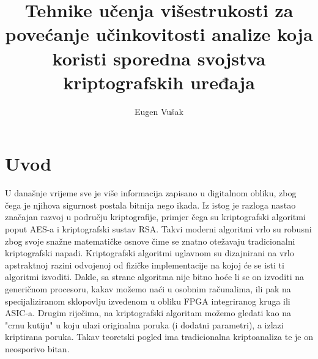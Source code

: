 \documentclass[times, utf8, diplomski]{fer}
\begin{document}

\title{
    Tehnike učenja višestrukosti za povećanje učinkovitosti
    analize koja koristi sporedna svojstva kriptografskih uređaja
}

\author{Eugen Vušak}




\tableofcontents


\chapter{Uvod}
U današnje vrijeme sve je više informacija zapisano u digitalnom obliku, zbog čega je njihova sigurnost postala bitnija nego ikada. Iz istog je razloga nastao značajan razvoj u području kriptografije, primjer čega su kriptografski algoritmi poput AES-a i kriptografski sustav RSA. Takvi moderni algoritmi vrlo su robusni zbog svoje snažne matematičke osnove čime se znatno otežavaju tradicionalni kriptografski napadi. Kriptografski algoritmi uglavnom su dizajnirani na vrlo apstraktnoj razini odvojenoj od fizičke implementacije na kojoj će se isti ti algoritmi izvoditi. Dakle, sa strane algoritma nije bitno hoće li se on izvoditi na generičnom procesoru, kakav možemo naći u osobnim računalima, ili pak na specijaliziranom sklopovlju izvedenom u obliku FPGA integriranog kruga ili ASIC-a. Drugim riječima, na kriptografski algoritam možemo gledati kao na "crnu kutiju" u koju ulazi originalna poruka (i dodatni parametri), a izlazi kriptirana poruka. Takav teoretski pogled ima tradicionalna kriptoanaliza te je on neosporivo bitan.
\end{document}
